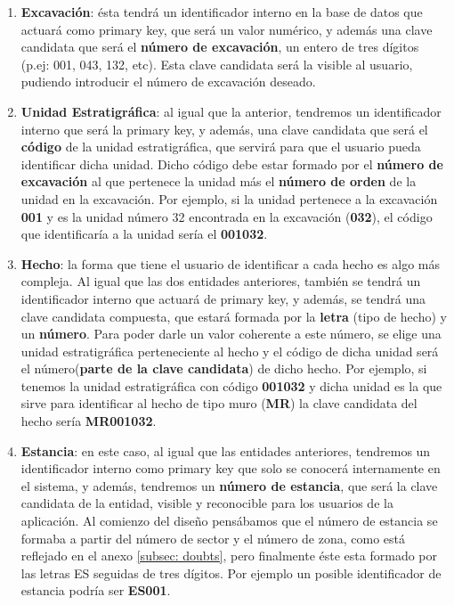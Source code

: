     \begin{enumerate}
        \item \textbf{Excavación}: ésta tendrá un identificador interno en la base de
        datos que actuará como primary key, que será un valor numérico, y además una clave
        candidata que será el \textbf{número de excavación}, un entero de tres dígitos
        (p.ej: 001, 043, 132, etc). Esta clave candidata será la visible al usuario, pudiendo
        introducir el número de excavación deseado.

        \item \textbf{Unidad Estratigráfica}: al igual que la anterior, tendremos un
        identificador interno que será la primary key, y además, una clave candidata que
        será el \textbf{código} de la unidad estratigráfica, que servirá para que el usuario
        pueda identificar dicha unidad. Dicho código debe estar formado por el
        \textbf{número de excavación} al que pertenece la unidad más el \textbf{número de orden}
        de la unidad en la excavación. Por ejemplo, si la unidad pertenece a la excavación
        \textbf{001} y es la unidad número 32 encontrada en la excavación (\textbf{032}), el
        código que identificaría a la unidad sería el \textbf{001032}.

        \item \textbf{Hecho}: la forma que tiene el usuario de identificar a cada hecho es algo
        más compleja. Al igual que las dos entidades anteriores, también se tendrá un
        identificador interno que actuará de primary key, y además, se tendrá una clave
        candidata compuesta, que estará formada por la \textbf{letra} (tipo de hecho) y un
        \textbf{número}. Para poder darle un valor coherente a este número, se elige una
        unidad estratigráfica perteneciente al hecho y el código de dicha unidad será el
        número(\textbf{parte de la clave candidata}) de dicho hecho. Por ejemplo, si tenemos
        la unidad estratigráfica con código \textbf{001032} y dicha unidad es la que sirve
        para identificar al hecho de tipo muro (\textbf{MR}) la clave candidata del hecho
        sería \textbf{MR001032}.

        \item \textbf{Estancia}: en este caso, al igual que las entidades anteriores,
        tendremos un identificador interno como primary key que solo se conocerá internamente
        en el sistema, y además, tendremos un \textbf{número de estancia}, que será la clave
        candidata de la entidad, visible y reconocible para los usuarios de la aplicación. Al
        comienzo del diseño pensábamos que el número de estancia se formaba a partir del número
        de sector y el número de zona, como está reflejado en el anexo \ref{subsec: doubts},
        pero finalmente éste esta formado por las letras ES seguidas de tres dígitos. Por ejemplo
        un posible identificador de estancia podría ser \textbf{ES001}.


\end{enumerate}
